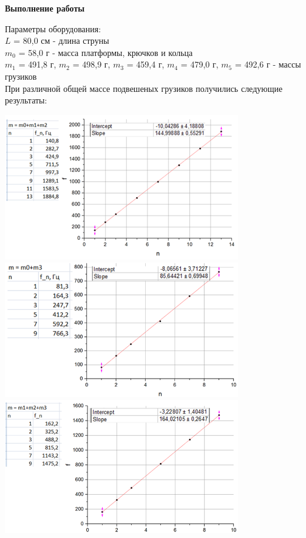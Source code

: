 \documentclass[12pt]{article}
\begin{document}
	\begin{center}
		\textbf{Выполнение работы}
	\end{center}
	Параметры оборудования:\\
	$L$ = 80,0 см - длина струны \\
	$m_0$ = 58,0 г - масса платформы, крючков и кольца \\
	$m_1$ = 491,8 г, $m_2$ = 498,9 г, $m_3$ = 459,4 г, $m_4$ = 479,0 г, $m_5$ = 492,6 г - массы грузиков\\
	При различной общей массе подвешеных грузиков получились следующие результаты:\\
	\begin{center}
		\includegraphics[width=4in]{5_2.png}\\
		\includegraphics[width=4in]{5_3.png}\\
		\includegraphics[width=4in]{5_4.png}\\

\end{center}
\end{document}
